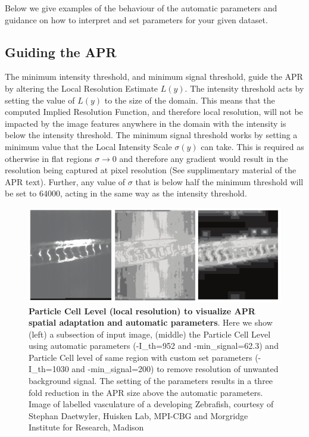 \documentclass[12pt]{article}
\begin{document}
Below we give examples of the behaviour of the automatic parameters and guidance on how to interpret and set parameters for your given dataset.
\subsection{Guiding the APR}
The minimum intensity threshold, and minimum signal threshold, guide the APR by altering the Local Resolution Estimate $L(y)$. The intensity threshold acts by setting the value of $L(y)$ to the size of the domain. This means that the computed Implied Resolution Function, and therefore local resolution, will not be impacted by the image features anywhere in the domain with the intensity is below the intensity threshold. The minimum signal threshold works by setting a minimum value that the Local Intensity Scale $\sigma(y)$ can take. This is required as otherwise in flat regions $\sigma \rightarrow 0$ and therefore any gradient would result in the resolution being captured at pixel resolution (See supplimentary material of the APR text). Further, any value of $\sigma$ that is below half the minimum threshold will be set to $64000$, acting in the same way as the intensity threshold.

\begin{figure}
	\begin{center}
		\includegraphics[width=1\textwidth]{level_parameters.pdf}
		\caption{\textbf{Particle Cell Level (local resolution) to visualize APR spatial adaptation and automatic parameters}. Here we show (left) a subsection of input image, (middle) the Particle Cell Level using automatic parameters (-I\_th=952 and -min\_signal=62.3) and Particle Cell level of same region with custom set parameters (-I\_th=1030 and -min\_signal=200) to remove resolution of unwanted background signal. The setting of the parameters results in a three fold reduction in the APR size above the automatic parameters. Image of labelled vasculature of a developing Zebrafish, courtesy of Stephan Daetwyler, Huisken Lab, MPI-CBG and Morgridge Institute for Research, Madison}\label{fig:Figure1}
	\end{center}
\end{figure}
\end{document}
